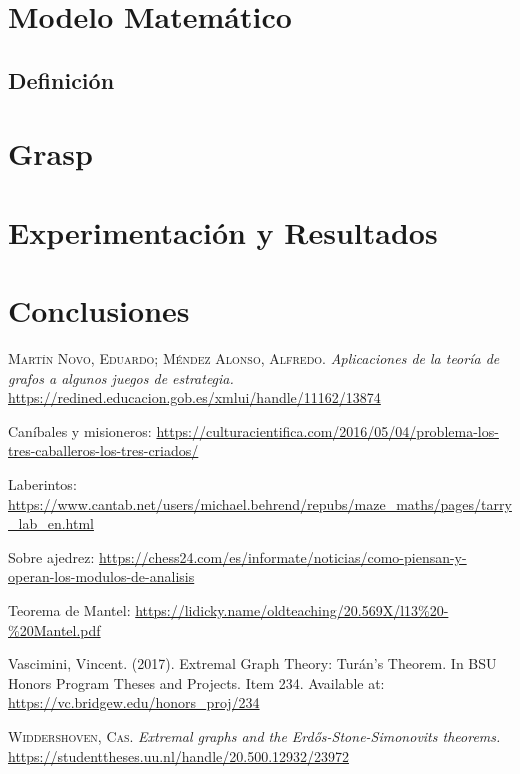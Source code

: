 \documentclass[12pt,a4paper]{book}
\begin{document}
\chapter{Modelo Matemático}

\section{Definición}

\chapter{Grasp}




\chapter{Experimentación y Resultados}


\chapter{Conclusiones}





\begin{thebibliography}{X}
     \textsc{Martín Novo, Eduardo; Méndez Alonso, Alfredo}.
    \textit{Aplicaciones de la teoría de grafos a algunos juegos de estrategia.}
    \url{https://redined.educacion.gob.es/xmlui/handle/11162/13874}

     Caníbales y misioneros: \url{https://culturacientifica.com/2016/05/04/problema-los-tres-caballeros-los-tres-criados/}

     Laberintos: \url{https://www.cantab.net/users/michael.behrend/repubs/maze_maths/pages/tarry_lab_en.html}
    
     Sobre ajedrez: \url{https://chess24.com/es/informate/noticias/como-piensan-y-operan-los-modulos-de-analisis}

     Teorema de Mantel: \url{https://lidicky.name/oldteaching/20.569X/l13%20-%20Mantel.pdf}

     Vascimini, Vincent. (2017). Extremal Graph Theory: Turán’s Theorem. 
    In BSU Honors Program Theses and Projects. Item 234. Available at: \url{https://vc.bridgew.edu/honors_proj/234}

     \textsc{Widdershoven, Cas.} \textit{Extremal graphs and the Erd{\H{o}}s-Stone-Simonovits theorems.}
    \url{https://studenttheses.uu.nl/handle/20.500.12932/23972}

\end{thebibliography}
\end{document}
